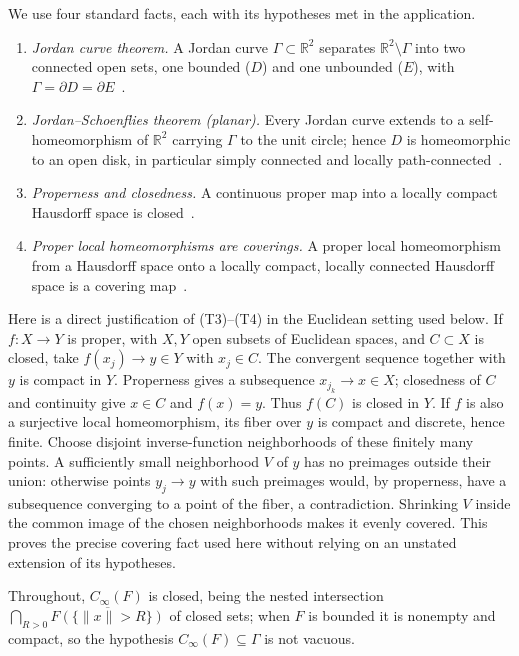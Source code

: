 \documentclass[11pt,twoside,leqno]{article}
\theoremstyle{plain}
\theoremstyle{definition}
\theoremstyle{remark}
\newcommand{\R}{\mathbb{R}}
\newcommand{\norm}[1]{\lVert #1 \rVert}
\newcommand{\clinf}{C_{\infty}}
\begin{document}
We use four standard facts, each with its hypotheses met in the application.
\begin{enumerate}[label=(T\arabic*),leftmargin=*]
\item \emph{Jordan curve theorem.} A Jordan curve $\Gamma\subset\R^2$ separates $\R^2\setminus\Gamma$ into two connected open sets, one bounded ($D$) and one unbounded ($E$), with $\Gamma=\partial D=\partial E$~\cite{thomassen}.
\item \emph{Jordan--Schoenflies theorem (planar).} Every Jordan curve extends to a self-homeomorphism of $\R^2$ carrying $\Gamma$ to the unit circle; hence $D$ is homeomorphic to an open disk, in particular simply connected and locally path-connected~\cite{thomassen}.
\item \emph{Properness and closedness.} A continuous proper map into a locally compact Hausdorff space is closed~\cite{ho}.
\item \emph{Proper local homeomorphisms are coverings.} A proper local homeomorphism from a Hausdorff space onto a locally compact, locally connected Hausdorff space is a covering map~\cite{ho}.
\end{enumerate}
Here is a direct justification of (T3)--(T4) in the Euclidean setting
used below. If $f:X\to Y$ is proper, with $X,Y$ open subsets of Euclidean
spaces, and $C\subset X$ is closed, take $f(x_j)\to y\in Y$ with $x_j\in C$.
The convergent sequence together with $y$ is compact in $Y$. Properness gives
a subsequence $x_{j_k}\to x\in X$; closedness of $C$ and continuity give
$x\in C$ and $f(x)=y$. Thus $f(C)$ is closed in $Y$.
If $f$ is also a surjective local homeomorphism, its fiber over $y$ is
compact and discrete, hence finite. Choose disjoint inverse-function
neighborhoods of these finitely many points. A sufficiently small
neighborhood $V$ of $y$ has no preimages outside their union: otherwise
points $y_j\to y$ with such preimages would, by properness, have a subsequence
converging to a point of the fiber, a contradiction. Shrinking $V$ inside
the common image of the chosen neighborhoods makes it evenly covered.
This proves the precise covering fact used here without relying on an
unstated extension of its hypotheses.

Throughout, $\clinf(F)$ is closed, being the nested intersection $\bigcap_{R>0}\overline{F(\{\norm{x}>R\})}$ of closed sets; when $F$ is bounded it is nonempty and compact, so the hypothesis $\clinf(F)\subseteq\Gamma$ is not vacuous.
\end{document}
